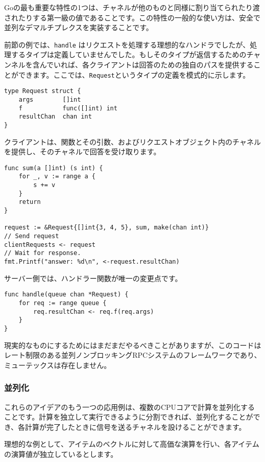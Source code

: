 \documentclass{jsarticle}
\begin{document}
Goの最も重要な特性の1つは、チャネルが他のものと同様に割り当てられたり渡されたりする第一級の値であることです。この特性の一般的な使い方は、安全で並列なデマルチプレクスを実装することです。

前節の例では、\texttt{handle}
はリクエストを処理する理想的なハンドラでしたが、処理するタイプは定義していませんでした。もしそのタイプが返信するためのチャンネルを含んでいれば、各クライアントは回答のための独自のパスを提供することができます。ここでは、\texttt{Request}というタイプの定義を模式的に示します。

\begin{lstlisting}[numbers=none]
type Request struct {
    args        []int
    f           func([]int) int
    resultChan  chan int
}
\end{lstlisting}

クライアントは、関数とその引数、およびリクエストオブジェクト内のチャネルを提供し、そのチャネルで回答を受け取ります。

\begin{lstlisting}[numbers=none]
func sum(a []int) (s int) {
    for _, v := range a {
        s += v
    }
    return
}

request := &Request{[]int{3, 4, 5}, sum, make(chan int)}
// Send request
clientRequests <- request
// Wait for response.
fmt.Printf("answer: %d\n", <-request.resultChan)
\end{lstlisting}

サーバー側では、ハンドラー関数が唯一の変更点です。

\begin{lstlisting}[numbers=none]
func handle(queue chan *Request) {
    for req := range queue {
        req.resultChan <- req.f(req.args)
    }
}
\end{lstlisting}

現実的なものにするためにはまだまだやるべきことがありますが、このコードはレート制限のある並列ノンブロッキングRPCシステムのフレームワークであり、ミューテックスは存在しません。

\subsubsection{並列化}

これらのアイデアのもう一つの応用例は、複数のCPUコアで計算を並列化することです。計算を独立して実行できるように分割できれば、並列化することができ、各計算が完了したときに信号を送るチャネルを設けることができます。

理想的な例として、アイテムのベクトルに対して高価な演算を行い、各アイテムの演算値が独立しているとします。
\end{document}

